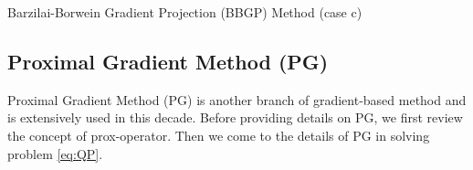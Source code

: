 \begin{algorithm}
    \caption{Barzilai-Borwein Gradient Projection (BBGP) Method (case c)}
    \label{alg:BBGP_on_QP}
    \begin{algorithmic}[1]
        \smallskip
            \smallskip
            \smallskip
            \smallskip
            \smallskip
            \smallskip
            \smallskip
            \smallskip
            \smallskip
            \smallskip
            \smallskip
        \EndFor
        \smallskip
    \end{algorithmic}
\end{algorithm}

\subsection{Proximal Gradient Method (PG)}
Proximal Gradient Method (PG) is another branch of gradient-based method and
is extensively used in this decade.
Before providing details on PG, we first review the concept of prox-operator.
Then we come to the details of PG in solving problem \eqref{eq:QP}.

